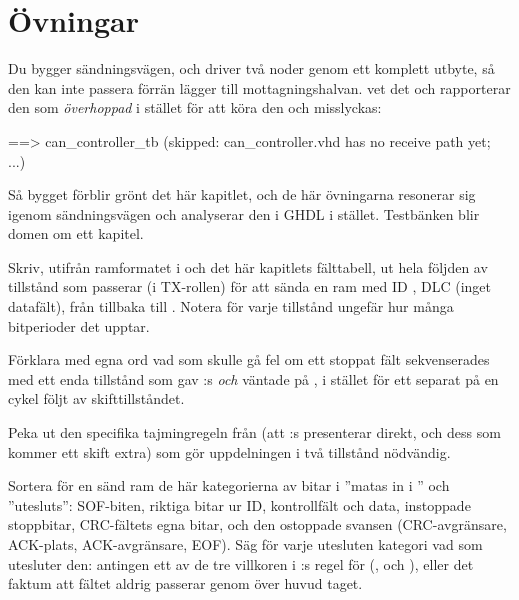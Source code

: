 
\section{Övningar}
\label{c16:sec:exercises}

\begin{aside}
Du bygger sändningsvägen, och  driver två noder genom ett komplett utbyte, så
den kan inte passera förrän  lägger till mottagningshalvan. 
vet det och rapporterar den som \emph{överhoppad} i stället för att köra den och misslyckas:

\begin{console}
==> can_controller_tb (skipped: can_controller.vhd has no receive path yet; ...)
\end{console}

Så bygget förblir grönt det här kapitlet, och de här övningarna resonerar sig igenom sändningsvägen
och analyserar den i GHDL i stället. Testbänken blir domen om ett kapitel.
\end{aside}

\label{c16:ex:shortframe}
Skriv, utifrån ramformatet i  och det här kapitlets fälttabell, ut hela
följden av tillstånd som  passerar (i TX-rollen) för att sända en ram med ID
, DLC  (inget datafält), från  tillbaka till .
Notera för varje tillstånd ungefär hur många bitperioder det upptar.

\label{c16:ex:loadstate}
 Förklara med egna ord vad som skulle gå fel om ett stoppat fält sekvenserades med ett enda
tillstånd som gav :s  \emph{och} väntade på , i stället för
ett separat  på en cykel följt av skifttillståndet.

 Peka ut den specifika tajmingregeln från  (att :s
 presenterar direkt, och dess  som kommer ett skift extra) som gör uppdelningen
i två tillstånd nödvändig.

\label{c16:ex:crcfeed}
 Sortera för en sänd ram de här kategorierna av bitar i ”matas in i ” och
”utesluts”: SOF-biten, riktiga bitar ur ID, kontrollfält och data, instoppade stoppbitar, CRC-fältets
egna bitar, och den ostoppade svansen (CRC-avgränsare, ACK-plats, ACK-avgränsare, EOF). Säg för varje
utesluten kategori vad som utesluter den: antingen ett av de tre villkoren i
:s regel för  (,  och
), eller det faktum att fältet aldrig passerar genom  över huvud taget.

